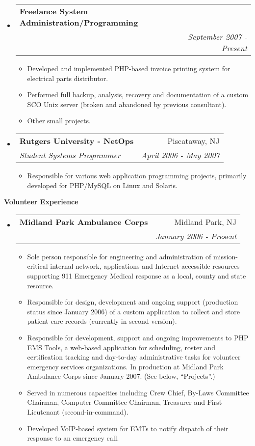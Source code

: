 \documentclass[letterpaper,11pt]{article}
\makeatletter
\newcommand{\resitem}[1]{\item #1 \vspace{-2pt}}
\newcommand{\resheading}[1]{{\large \colorbox{mygrey}{\begin{minipage}{\textwidth}{\textbf{#1 \vphantom{p\^{E}}}}\end{minipage}}}}
\newcommand{\ressubheading}[4]{
\begin{tabular*}{7.0in}{l@{\extracolsep{\fill}}r}
		\textbf{#1} & #2 \\
		\textit{#3} & \textit{#4} \\
\end{tabular*}\vspace{-6pt}}
\makeatother
\begin{document}
\begin{itemize}
\item
        \ressubheading{Freelance System Administration/Programming}{ }{ }{September 2007 - Present}
        \begin{itemize}
               \resitem{Developed and implemented PHP-based invoice printing system for electrical parts distributor.}
               \resitem{Performed full backup, analysis, recovery and documentation of a custom SCO Unix server (broken and abandoned by previous consultant).}
               \resitem{Other small projects.}
        \end{itemize}

\item
	\ressubheading{Rutgers University - NetOps}{Piscataway, NJ}{Student Systems Programmer}{April 2006 - May 2007}
	\begin{itemize}
		\resitem{Responsible for various web application programming projects, primarily developed for
                  PHP/MySQL on Linux and Solaris.}
	\end{itemize}

\end{itemize}

\pagebreak

\resheading{Volunteer Experience}
\begin{itemize}
\item
        \ressubheading{Midland Park Ambulance Corps}{Midland Park, NJ}{}{January 2006 - Present}
        \begin{itemize}
                \resitem{Sole person responsible for engineering and administration of
                  mission-critical internal network, applications and
                  Internet-accessible resources supporting 911 Emergency
                  Medical response as a local, county and state resource.}
                \resitem{Responsible for design, development and ongoing support (production
                  status since January 2006) of a custom application to
                  collect and store patient care records (currently in second version).}
                \resitem{Responsible for development, support and ongoing
                  improvements to PHP EMS Tools, a web-based application for
                  scheduling, roster and certification tracking and day-to-day
                administrative tasks for volunteer emergency services
                organizations. In production at Midland Park Ambulance Corps
                since January 2007. (See below, ``Projects''.)}
                \resitem{Served in numerous capacities including Crew Chief,
                  By-Laws Committee Chairman, Computer Committee Chairman,
                  Treasurer and First Lieutenant (second-in-command).}
                \resitem{Developed VoIP-based system for EMTs to notify
                  dispatch of their response to an emergency call.}
        \end{itemize}
\end{itemize}
\end{document}
